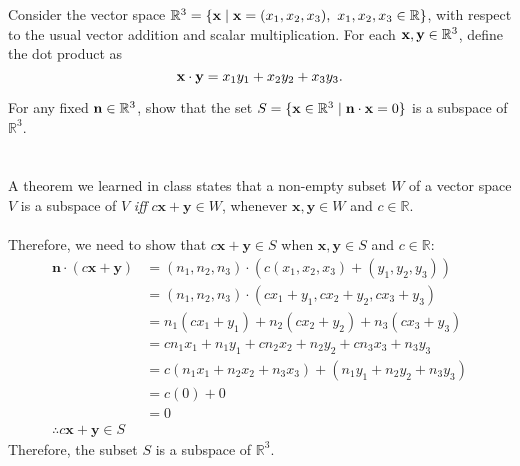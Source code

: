 \documentclass[10pt]{exam}
\newcommand{\tb}{\textbf}
\newcommand{\noin}{\noindent}
\begin{document}
\vspace{0.2in}
{\large 
{} 

\vspace{0.2in}


}

\vfill


\pagebreak


\noin {\tb 1.}  Consider the vector space $\mathbb R^3 = \{  {\bf x} \mid {\bf x}=(x_1, x_2, x_3),\,\,  x_1, x_2, x_3 \in \mathbb R \}$, with respect to the usual vector addition and scalar multiplication.  For each ${\bf x}, {\bf y}\in \mathbb R^3$, define the dot product as
$${\bf x}\cdot {\bf y}= x_1y_1+x_2y_2+x_3y_3.$$

\vspace{20pt}

	
\noin {\bf 1(a)}   For any fixed ${\bf n} \in \mathbb R^3$, show that the set $S=\{ {\bf x}\in \mathbb R^3 \mid {\bf n}\cdot {\bf x} =0 \}$ is a subspace of $\mathbb R^3$.
\\
\\
\\
A theorem we learned in class states that a non-empty subset $W$ of a vector 
space $V$ is a subspace of $V$ \emph{iff} $c\textbf{x}+\textbf{y} \in W$, whenever
$\textbf{x}, \textbf{y} \in W$ and $c \in \mathbb{R}$. 
\\
\\
Therefore, we need to show that $c\textbf{x}+\textbf{y} \in S$ when $\textbf{x}, 
\textbf{y} \in S$ and $c \in \mathbb{R}$:
\begin{align*}
	\textbf{n} \cdot (c\textbf{x}+\textbf{y}) &= (n_1, n_2, n_3) \cdot (c(x_1,x_2,x_3)+(y_1,y_2,y_3)) \\
	&= (n_1, n_2, n_3) \cdot (cx_1+y_1, cx_2+y_2, cx_3+y_3) \\
	&= n_1(cx_1+y_1) + n_2(cx_2+y_2) + n_3(cx_3+y_3) \\
	&= cn_1x_1 + n_1y_1 + cn_2x_2 + n_2y_2 + cn_3x_3 + n_3y_3 \\
	&= c(n_1x_1 + n_2x_2 + n_3x_3) + (n_1y_1 + n_2y_2 + n_3y_3) \\
	&= c(0) + 0 \\
	&= 0 \\
	\therefore c\textbf{x}+\textbf{y} \in S
\end{align*}
Therefore, the subset $S$ is a subspace of $\mathbb{R}^3$.
\end{document}
